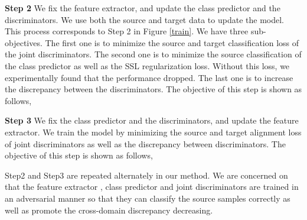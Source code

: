 \documentclass{ecai}
\begin{document}
\textbf{Step 2} We fix the feature extractor, and update the class predictor and the discriminators. We use both the source and target data to update the model. This process corresponds to Step 2 in Figure \ref{train}. We have three sub-objectives. The first one is to minimize the source and target classification loss of the joint discriminators. The second one is to minimize the source classification of the class predictor as well as  the SSL regularization loss. Without this loss, we experimentally found that the performance dropped. The last one is to increase the discrepancy between the discriminators. The objective of this step is shown as follows,


\textbf{Step 3} We fix the class predictor and the discriminators, and update the feature extractor. We train the model by minimizing the source and target alignment loss of joint discriminators as well as the discrepancy between discriminators. The objective of this step is shown as follows,

Step2 and Step3 are repeated alternately in our method. We are concerned on that the feature extractor , class predictor and joint discriminators are trained in an adversarial manner so that they can classify the source samples correctly as well as promote the cross-domain discrepancy decreasing.
\end{document}
